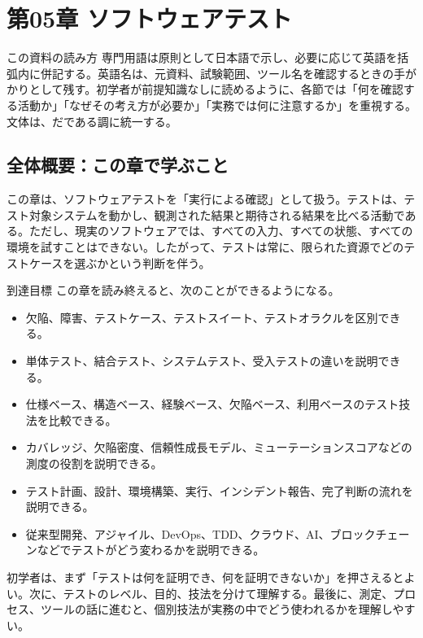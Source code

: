 \section{第05章 ソフトウェアテスト}
\begin{pointbox}{この資料の読み方}
専門用語は原則として日本語で示し、必要に応じて英語を括弧内に併記する。英語名は、元資料、試験範囲、ツール名を確認するときの手がかりとして残す。初学者が前提知識なしに読めるように、各節では「何を確認する活動か」「なぜその考え方が必要か」「実務では何に注意するか」を重視する。文体は、だである調に統一する。
\end{pointbox}

\subsection*{全体概要：この章で学ぶこと}
この章は、ソフトウェアテストを「実行による確認」として扱う。テストは、テスト対象システムを動かし、観測された結果と期待される結果を比べる活動である。ただし、現実のソフトウェアでは、すべての入力、すべての状態、すべての環境を試すことはできない。したがって、テストは常に、限られた資源でどのテストケースを選ぶかという判断を伴う。

\begin{pointbox}{到達目標}
この章を読み終えると、次のことができるようになる。
\begin{itemize}[leftmargin=2em]
  \item 欠陥、障害、テストケース、テストスイート、テストオラクルを区別できる。
  \item 単体テスト、結合テスト、システムテスト、受入テストの違いを説明できる。
  \item 仕様ベース、構造ベース、経験ベース、欠陥ベース、利用ベースのテスト技法を比較できる。
  \item カバレッジ、欠陥密度、信頼性成長モデル、ミューテーションスコアなどの測度の役割を説明できる。
  \item テスト計画、設計、環境構築、実行、インシデント報告、完了判断の流れを説明できる。
  \item 従来型開発、アジャイル、DevOps、TDD、クラウド、AI、ブロックチェーンなどでテストがどう変わるかを説明できる。
\end{itemize}
\end{pointbox}

初学者は、まず「テストは何を証明でき、何を証明できないか」を押さえるとよい。次に、テストのレベル、目的、技法を分けて理解する。最後に、測定、プロセス、ツールの話に進むと、個別技法が実務の中でどう使われるかを理解しやすい。

